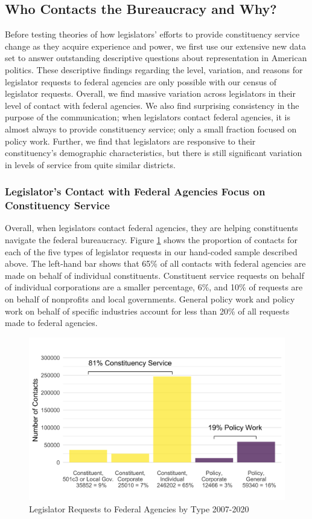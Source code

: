 \documentclass[12pt]{article}
\begin{document}
\subsection{Who Contacts the Bureaucracy and Why?} \label{s:descriptive} 
Before testing theories of how legislators' efforts to provide constituency service change as they acquire experience and power, we first use our extensive new data set to answer outstanding descriptive questions about representation in American politics. These descriptive findings regarding the level, variation, and reasons for legislator requests to federal agencies are only possible with our census of legislator requests. Overall, we find massive variation across legislators in their level of contact with federal agencies. We also find surprising consistency in the purpose of the communication; when legislators contact federal agencies, it is almost always to provide constituency service; only a small fraction focused on policy work. Further, we find that legislators are responsive to their constituency's demographic characteristics, but there is still significant variation in levels of service from quite similar districts.  

\subsubsection{Legislator's Contact with Federal Agencies Focus on Constituency Service}
Overall, when legislators contact federal agencies, they are helping constituents navigate the federal bureaucracy. Figure \ref{f:type2} shows the proportion of contacts for each of the five types of legislator requests in our hand-coded sample described above. 
The left-hand bar shows that 65\% of all contacts with federal agencies are made on behalf of individual constituents. Constituent service requests on behalf of individual corporations are a smaller percentage, 6\%, and 10\% of requests are on behalf of nonprofits and local governments. General policy work and policy work on behalf of specific industries account for less than 20\% of all requests made to federal agencies.  


\begin{figure}[hbt!]
\centering
\caption{Legislator Requests to Federal Agencies by Type 2007-2020} \label{f:type2}
\includegraphics[width = .8\textwidth]{figs/data_by_type-tall-1}
\end{figure}
\end{document}
